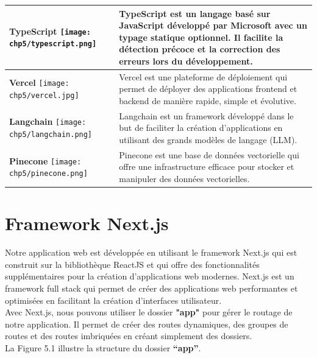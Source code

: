 \begin{longtable}{|p{4cm}|p{11cm}|}
    \centering \textbf{TypeScript} \vspace{0.2cm} \newline \centering \texttt{[image: chp5/typescript.png]} & TypeScript est un langage basé sur JavaScript développé par Microsoft avec un typage statique optionnel. Il facilite la détection précoce et la correction des erreurs lors du développement. \\
    \hline
    \centering \textbf{Vercel} \vspace{0.2cm} \newline \centering \texttt{[image: chp5/vercel.jpg]} & Vercel est une plateforme de déploiement qui permet de déployer des applications frontend et backend de manière rapide, simple et évolutive. \\
    \hline
    \centering \textbf{Langchain} \vspace{0.2cm} \newline \centering \texttt{[image: chp5/langchain.png]} & Langchain est un framework développé dans le but de faciliter la création d'applications en utilisant des grands modèles de langage (LLM). \\
    \hline
    \centering \textbf{Pinecone} \vspace{0.2cm} \newline \centering \texttt{[image: chp5/pinecone.png]} & Pinecone est une base de données vectorielle qui offre une infrastructure efficace pour stocker et manipuler des données vectorielles. \\
    \hline
\end{longtable}

\section{Framework Next.js}
Notre application web est développée en utilisant le framework Next.js qui est construit sur la bibliothèque ReactJS et qui offre des fonctionnalités supplémentaires pour la création d'applications web modernes. Next.js est un framework full stack qui permet de créer des applications web performantes et optimisées en facilitant la création d'interfaces utilisateur.\\
Avec Next.js, nous pouvons utiliser le dossier \textbf{"app"} pour gérer le routage de notre application. Il permet de créer des routes dynamiques, des groupes de routes et des routes imbriquées en créant simplement des dossiers.\\
La Figure 5.1 illustre la structure du dossier \textbf{“app”}.\\


